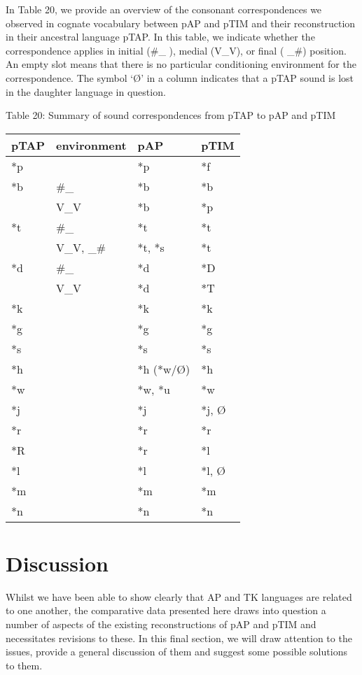 In Table 20, we provide an overview of the consonant correspondences we observed in cognate vocabulary between pAP and pTIM and their reconstruction in their ancestral language pTAP. In this table, we indicate whether the correspondence applies in initial (\#\_ ), medial (V\_V), or final ( \_\#) position. An empty slot means that there is no particular conditioning environment for the correspondence. The symbol {\textquoteleft}{\O}{\textquoteright} in a column indicates that a pTAP sound is lost in the daughter language in question. 

{\centering
Table 20: Summary of sound correspondences from pTAP to pAP and pTIM
\par}

\begin{center}
\tablehead{}
\begin{supertabular}{m{0.9240598in}m{0.9247598in}m{0.9247598in}m{0.9240598in}}
\hline
pTAP &
environment &
pAP &
pTIM\\\hline
*p &
 &
*p &
*f\\
*b &
\#\_ &
*b &
*b\\
 &
V\_V &
*b &
*p\\
*t &
\#\_ &
*t &
*t\\
 &
V\_V, \_\# &
*t, *s &
*t\\
*d &
\#\_ &
*d &
*D\\
 &
V\_V &
*d &
*T\\
*k &
 &
*k &
*k\\
*g &
 &
*g &
*g\\
*s &
 &
*s &
*s\\
*h &
 &
*h (*w/{\O}) &
*h\\
*w &
 &
*w, *u &
*w\\
*j &
 &
*j &
*j, {\O}\\
*r &
 &
*r &
*r\\
*R &
 &
*r &
*l\\
*l &
 &
*l &
*l, {\O}\\
*m &
 &
*m &
*m\\
*n &
 &
*n &
*n\\\hline
\end{supertabular}
\end{center}
\section[Discussion]{Discussion}
\hypertarget{RefHeading65423871885726}{}Whilst we have been able to show clearly that AP and TK languages are related to one another, the comparative data presented here draws into question a number of aspects of the existing reconstructions of pAP and pTIM and necessitates revisions to these. In this final section, we will draw attention to the issues, provide a general discussion of them and suggest some possible solutions to them. 

